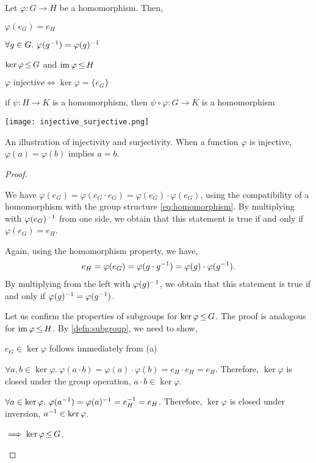 \begin{lem}
Let $\varphi : G \to H$ be a homomorphism. Then,
\begin{lemlist}
    \item $\varphi(e_G) = e_H$
    \item $\forall g \in G.\ \varphi(g^{-1}) = \varphi(g)^{-1}$
    \item\label{lem:homomorphism_kernel_subgroup} $\ker{\varphi} \operatorname*{\leq} G$ and $\operatorname*{im}{\varphi} \operatorname*{\leq} H$
    \item $\text{$\varphi$ injective} \iff \ker{\varphi} = \{e_G\}$
    \item if $\psi : H \to K$ is a homomorphism, then $\psi \circ \varphi : G \to K$ is a homomorphism
\end{lemlist}
\end{lem} \begin{marginfigure}
    \texttt{[image: injective\_surjective.png]}
    \caption{An illustration of injectivity and surjectivity. When a function $\varphi$ is injective, $\varphi(a) = \varphi(b)$ implies $a = b$.}
\end{marginfigure} \begin{proof}
\leavevmode\begin{lemlist}
    \item We have $\varphi(e_G) = \varphi(e_G \cdot e_G) = \varphi(e_G) \cdot \varphi(e_G)$, using the compatibility of a homomorphism with the group structure \eqref{eq:homomorphism}. By multiplying with $\varphi(e_G)^{-1}$ from one side, we obtain that this statement is true if and only if $\varphi(e_G) = e_H$.
    
    \item Again, using the homomorphism property, we have, \begin{align*}
        e_H = \varphi(e_G) = \varphi(g \cdot g^{-1}) = \varphi(g) \cdot \varphi(g^{-1}).
    \end{align*} By multiplying from the left with $\varphi(g)^{-1}$, we obtain that this statement is true if and only if $\varphi(g)^{-1} = \varphi(g^{-1})$.
    
    \item Let us confirm the properties of subgroups for $\ker{\varphi} \operatorname*{\leq} G$. The proof is analogous for $\operatorname*{im}{\varphi} \operatorname*{\leq} H$. By \cref{defn:subgroup}, we need to show, \begin{nestedlemlist}
        \item $e_G \in \ker{\varphi}$ follows immediately from (a)
        \item $\forall a, b \in \ker{\varphi}.\ \varphi(a \cdot b) = \varphi(a) \cdot \varphi(b) = e_H \cdot e_H = e_H$. Therefore, $\ker{\varphi}$ is closed under the group operation, $a \cdot b \in \ker{\varphi}$.
        \item $\forall a \in \ker{\varphi}.\ \varphi(\inv{a}) = \inv{\varphi(a)} = \inv{e_H} = e_H$. Therefore, $\ker{\varphi}$ is closed under inversion, $a^{-1} \in \ker{\varphi}$.
    \end{nestedlemlist}
    $\implies \ker{\varphi} \operatorname*{\leq} G$.
    

\end{lemlist}
\end{proof}

